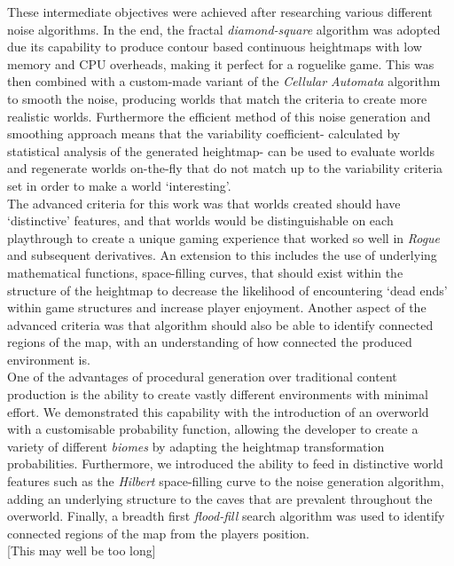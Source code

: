 \documentclass[12pt,a4paper]{article}
\begin{document}
These intermediate objectives were achieved after researching various different noise algorithms. In the end, the fractal \emph{diamond-square} algorithm was adopted due its capability to produce contour based continuous heightmaps with low memory and CPU overheads, making it perfect for a roguelike game. This was then combined with a custom-made variant of the \emph{Cellular Automata} algorithm to smooth the noise, producing worlds that match the criteria to create more realistic worlds. Furthermore the efficient method of this noise generation and smoothing approach means that the variability coefficient- calculated by statistical analysis of the generated heightmap- can be used to evaluate worlds and regenerate worlds  on-the-fly that do not match up to the variability criteria set in order to make a world `interesting'. \\

The advanced criteria for this work was that worlds created should have `distinctive' features, and that worlds would be distinguishable on each playthrough to create a unique gaming experience that worked so well in \emph{Rogue} and subsequent derivatives. An extension to this includes the use of underlying mathematical functions, space-filling curves, that should exist within the structure of the heightmap to decrease the likelihood of encountering `dead ends' within game structures and increase player enjoyment.  Another aspect of the advanced criteria was that algorithm should also be able to identify connected regions of the map, with an understanding of how connected the produced environment is.\\

One of the advantages of procedural generation over traditional content production is the ability to create vastly different environments with minimal effort. We demonstrated this capability with the introduction of an overworld with a customisable probability function, allowing the developer to create a variety of different \emph{biomes} by adapting the heightmap transformation probabilities. Furthermore, we introduced the ability to feed in distinctive world features such as the \emph{Hilbert} space-filling curve to the noise generation algorithm, adding an underlying structure to the caves that are prevalent throughout the overworld. Finally, a breadth first \emph{flood-fill} search algorithm was used to identify connected regions of the map from the players position. \\


[This may well be too long]
\end{document}

